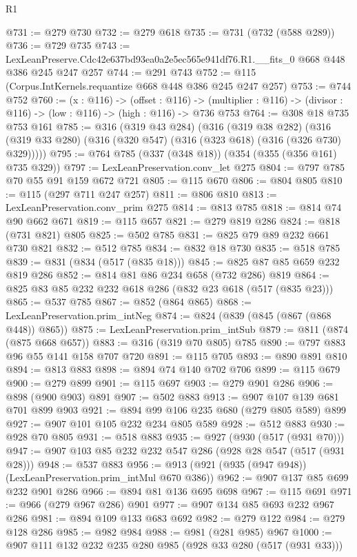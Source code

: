 \begin{lexlean}{R1}
\begin{coremodule}
@731 := @279 @730
@732 := @279 @618
@735 := @731 (@732 (@588 @289))
@736 := @729 @735
@743 := LexLeanPreserve.Cdc42e637bd93ea0a2e5ec565e941df76.R1.__fits_0 @668 @448 @386 @245 @247 @257
@744 := @291 @743
@752 := @115 (Corpus.IntKernels.requantize @668 @448 @386 @245 @247 @257)
@753 := @744 @752
@760 := (x : @116) ->
  (offset : @116) ->
  (multiplier : @116) -> (divisor : @116) -> (low : @116) -> (high : @116) -> @736 @753
@764 := @308 @18 @735 @753 @161
@785 := @316
    (@319 @43 @284)
    (@316
      (@319 @38 @282)
      (@316 (@319 @33 @280) (@316 (@320 @547) (@316 (@323 @618) (@316 (@326 @730) @329)))))
@795 := @764 @785 (@337 (@348 @18)) (@354 (@355 (@356 @161) @735 @329))
@797 := LexLeanPreservation.conv_let @275
@804 := @797 @785 @70 @55 @91 @159 @672 @721
@805 := @115 @670
@806 := @804 @805
@810 := @115 (@297 @711 @247 @257)
@811 := @806 @810
@813 := LexLeanPreservation.conv_prim @275
@814 := @813 @785
@818 := @814 @74 @90 @662 @671
@819 := @115 @657
@821 := @279 @819 @286
@824 := @818 (@731 @821) @805
@825 := @502 @785
@831 := @825 @79 @89 @232 @661 @730 @821
@832 := @512 @785
@834 := @832 @18 @730
@835 := @518 @785
@839 := @831 (@834 (@517 (@835 @18)))
@845 := @825 @87 @85 @659 @232 @819 @286
@852 := @814 @81 @86 @234 @658 (@732 @286) @819
@864 := @825 @83 @85 @232 @232 @618 @286 (@832 @23 @618 (@517 (@835 @23)))
@865 := @537 @785
@867 := @852 (@864 @865)
@868 := LexLeanPreservation.prim_intNeg
@874 := @824 (@839 (@845 (@867 (@868 @448)) @865))
@875 := LexLeanPreservation.prim_intSub
@879 := @811 (@874 (@875 @668 @657))
@883 := @316 (@319 @70 @805) @785
@890 := @797 @883 @96 @55 @141 @158 @707 @720
@891 := @115 @705
@893 := @890 @891 @810
@894 := @813 @883
@898 := @894 @74 @140 @702 @706
@899 := @115 @679
@900 := @279 @899
@901 := @115 @697
@903 := @279 @901 @286
@906 := @898 (@900 @903) @891
@907 := @502 @883
@913 := @907 @107 @139 @681 @701 @899 @903
@921 := @894 @99 @106 @235 @680 (@279 @805 @589) @899
@927 := @907 @101 @105 @232 @234 @805 @589
@928 := @512 @883
@930 := @928 @70 @805
@931 := @518 @883
@935 := @927 (@930 (@517 (@931 @70)))
@947 := @907 @103 @85 @232 @232 @547 @286 (@928 @28 @547 (@517 (@931 @28)))
@948 := @537 @883
@956 := @913 (@921 (@935 (@947 @948)) (LexLeanPreservation.prim_intMul @670 @386))
@962 := @907 @137 @85 @699 @232 @901 @286
@966 := @894 @81 @136 @695 @698
@967 := @115 @691
@971 := @966 (@279 @967 @286) @901
@977 := @907 @134 @85 @693 @232 @967 @286
@981 := @894 @109 @133 @683 @692
@982 := @279 @122
@984 := @279 @128 @286
@985 := @982 @984
@988 := @981 (@281 @985) @967
@1000 := @907 @111 @132 @232 @235 @280 @985 (@928 @33 @280 (@517 (@931 @33)))

\end{coremodule}
\end{lexlean}
